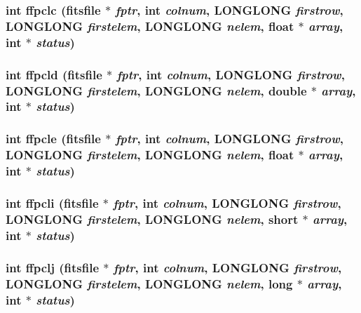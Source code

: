 \subsubsection{\setlength{\rightskip}{0pt plus 5cm}int ffpclc (\bf{fitsfile} $\ast$ {\em fptr}, int {\em colnum}, \bf{LONGLONG} {\em firstrow}, \bf{LONGLONG} {\em firstelem}, \bf{LONGLONG} {\em nelem}, float $\ast$ {\em array}, int $\ast$ {\em status})}\label{fitsio_8h_f28b5d35cf1bfba0826c8bac66ecf702}


\subsubsection{\setlength{\rightskip}{0pt plus 5cm}int ffpcld (\bf{fitsfile} $\ast$ {\em fptr}, int {\em colnum}, \bf{LONGLONG} {\em firstrow}, \bf{LONGLONG} {\em firstelem}, \bf{LONGLONG} {\em nelem}, double $\ast$ {\em array}, int $\ast$ {\em status})}\label{fitsio_8h_19edb8890772979f20c6f6e5957b2ad1}


\subsubsection{\setlength{\rightskip}{0pt plus 5cm}int ffpcle (\bf{fitsfile} $\ast$ {\em fptr}, int {\em colnum}, \bf{LONGLONG} {\em firstrow}, \bf{LONGLONG} {\em firstelem}, \bf{LONGLONG} {\em nelem}, float $\ast$ {\em array}, int $\ast$ {\em status})}\label{fitsio_8h_2af80b40c939d1d21b4da19e8999421c}


\subsubsection{\setlength{\rightskip}{0pt plus 5cm}int ffpcli (\bf{fitsfile} $\ast$ {\em fptr}, int {\em colnum}, \bf{LONGLONG} {\em firstrow}, \bf{LONGLONG} {\em firstelem}, \bf{LONGLONG} {\em nelem}, short $\ast$ {\em array}, int $\ast$ {\em status})}\label{fitsio_8h_097003985cb9d02ceced5a5744bfa0fc}


\subsubsection{\setlength{\rightskip}{0pt plus 5cm}int ffpclj (\bf{fitsfile} $\ast$ {\em fptr}, int {\em colnum}, \bf{LONGLONG} {\em firstrow}, \bf{LONGLONG} {\em firstelem}, \bf{LONGLONG} {\em nelem}, long $\ast$ {\em array}, int $\ast$ {\em status})}\label{fitsio_8h_5792d2cdff6869df24d96769d29588bb}


